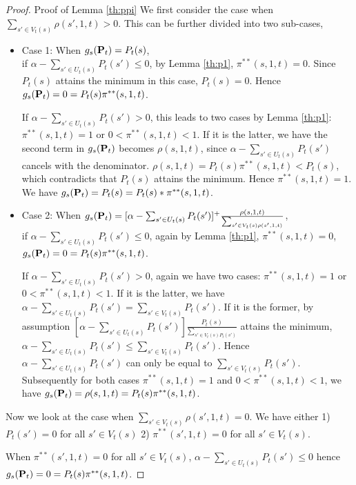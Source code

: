 \section{}\label{ap:ppi}
\begin{proof}{Proof of Lemma \ref{th:ppi}}
We first consider the case when $\sum_{s'\in V_{t}(s)}\rho(s',1,t)>0$. This can be further divided into two sub-cases,
\begin{itemize}
\item Case 1: When $g_s(\mathbf{P}_t) = P_t(s)$,\\
if $\alpha-\sum_{s'\in U_t(s)}P_t(s')\leq 0$, by Lemma \ref{th:p1}, $\pi^{**}(s,1,t)=0$. Since $P_t(s)$ attains the minimum in this case, $P_t(s)=0$. Hence $g_s(\mathbf{P}_t)=0=P_t(s)\pi^{**}(s,1,t)$.

If $\alpha-\sum_{s'\in U_t(s)}P_t(s')> 0$, this leads to two cases by Lemma \ref{th:p1}: $\pi^{**}(s,1,t)=1$ or $0<\pi^{**}(s,1,t)<1$. If it is the latter, we have the second term in $g_s(\mathbf{P}_t)$ becomes $\rho(s,1,t)$, since $\alpha-\sum_{s'\in U_t(s)}P_t(s')$ cancels with the denominator. $\rho(s,1,t)=P_t(s)\pi^{**}(s,1,t)<P_t(s)$, which contradicts that $P_t(s)$ attains the minimum. Hence $\pi^{**}(s,1,t) = 1$. We have $g_s(\mathbf{P}_t) = P_t(s) = P_t(s)*\pi^{**}(s,1,t)$.
\item Case 2: When $g_s(\mathbf{P}_t) = [\alpha-\sum_{s'\in U_t(s)}P_t(s')]^+\frac{\rho(s,1,t)}{\sum_{s'\in V_t(s)\rho(s',1,t)}}$,\\
if $\alpha-\sum_{s'\in U_t(s)}P_t(s') \leq 0$, again by Lemma \ref{th:p1}, $\pi^{**}(s,1,t)=0$, $g_s(\mathbf{P}_t) = 0 = P_t(s)\pi^{**}(s,1,t)$.

If $\alpha-\sum_{s'\in U_t(s)}P_t(s') > 0$, again we have two cases: $\pi^{**}(s,1,t)=1$ or $0<\pi^{**}(s,1,t)<1$. If it is the latter, we have $\alpha-\sum_{s'\in U_t(s)}P_t(s')=\sum_{s'\in V_t(s)}P_t(s')$. 
If it is the former, by assumption $[\alpha-\sum_{s'\in U_t(s)}P_t(s')]\frac{P_t(s)}{\sum_{s'\in V_t(s)P_t(s')}}$ attains the minimum, $\alpha-\sum_{s'\in U_t(s)}P_t(s') \leq \sum_{s'\in V_t(s)}P_t(s')$. Hence $\alpha-\sum_{s'\in U_t(s)}P_t(s')$ can only be equal to $\sum_{s'\in V_t(s)}P_t(s')$. Subsequently for both cases  $\pi^{**}(s,1,t)=1$ and $0<\pi^{**}(s,1,t)<1$, we have $g_s(\mathbf{P}_t) = \rho(s,1,t)=P_t(s)\pi^{**}(s,1,t)$.
\end{itemize}

Now we look at the case when $\sum_{s'\in V_t(s)}\rho(s',1,t)=0$. We have either 1) $P_t(s')=0$ for all $s'\in V_t(s)$ 
2) $\pi^{**}(s',1,t)=0$ for all $s'\in V_t(s)$. 

When $\pi^{**}(s',1,t)=0$ for all $s'\in V_t(s)$, $\alpha-\sum_{s'\in U_t(s)}P_t(s')\leq 0$
hence $g_s(\mathbf{P}_t) = 0 = P_t(s)\pi^{**}(s,1,t)$.  
\end{proof}